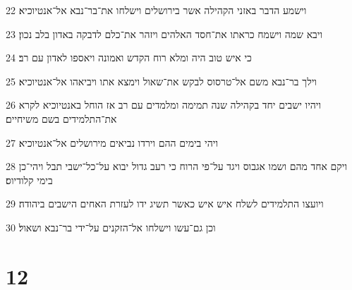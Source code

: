 \par 22 וישמע הדבר באזני הקהילה אשר בירושלים וישלחו את־בר־נבא אל־אנטיוכיא׃
\par 23 ויבא שמה וישמח כראתו את־חסד האלהים ויזהר את־כלם לדבקה באדון בלב נכון׃
\par 24 כי איש טוב היה ומלא רוח הקדש ואמונה ויאספו לאדון עם רב׃
\par 25 וילך בר־נבא משם אל־טרסוס לבקש את־שאול וימצא אתו ויביאהו אל־אנטיוכיא׃
\par 26 ויהיו ישבים יחד בקהילה שנה תמימה ומלמדים עם רב אז הוחל באנטיוכיא לקרא את־התלמידים בשם משיחיים׃
\par 27 ויהי בימים ההם וירדו נביאים מירושלים אל־אנטיוכיא׃
\par 28 ויקם אחד מהם ושמו אגבוס ויגד על־פי הרוח כי רעב גדול יבוא על־כל־ישבי תבל ויהי־כן בימי קלודיוס׃
\par 29 ויועצו התלמידים לשלח איש איש כאשר תשיג ידו לעזרת האחים הישבים ביהודה׃
\par 30 וכן גם־עשו וישלחו אל־הזקנים על־ידי בר־נבא ושאול׃

\chapter{12}

